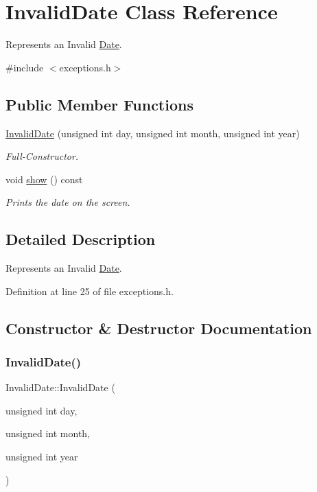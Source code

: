 \hypertarget{class_invalid_date}{}\section{Invalid\+Date Class Reference}
\label{class_invalid_date}


Represents an Invalid \hyperlink{class_date}{Date}.  




{\ttfamily \#include $<$exceptions.\+h$>$}

\subsection*{Public Member Functions}
\begin{DoxyCompactItemize}
\item 
\hyperlink{class_invalid_date_aec8bd136d7adb6bccf44bf6d9f078a40}{Invalid\+Date} (unsigned int day, unsigned int month, unsigned int year)
\begin{DoxyCompactList}\small\item\em Full-\/\+Constructor. \end{DoxyCompactList}\item 
void \hyperlink{class_invalid_date_a665b9e90ec4cab29d400010cd73bb8ed}{show} () const
\begin{DoxyCompactList}\small\item\em Prints the date on the screen. \end{DoxyCompactList}\end{DoxyCompactItemize}


\subsection{Detailed Description}
Represents an Invalid \hyperlink{class_date}{Date}. 

Definition at line 25 of file exceptions.\+h.



\subsection{Constructor \& Destructor Documentation}
\hypertarget{class_invalid_date_aec8bd136d7adb6bccf44bf6d9f078a40}{}\label{class_invalid_date_aec8bd136d7adb6bccf44bf6d9f078a40} 
\subsubsection{\texorpdfstring{Invalid\+Date()}{InvalidDate()}}
{\footnotesize\ttfamily Invalid\+Date\+::\+Invalid\+Date (\begin{DoxyParamCaption}\item[{unsigned int}]{day,  }\item[{unsigned int}]{month,  }\item[{unsigned int}]{year }\end{DoxyParamCaption})\hspace{0.3cm}{\ttfamily [inline]}}



